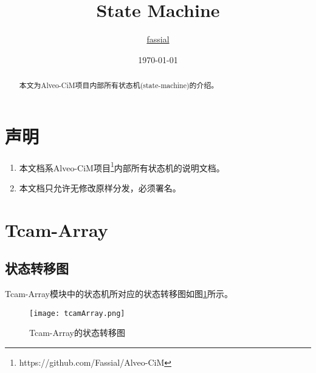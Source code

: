 \documentclass[lang=cn,11pt]{elegantpaper}
\title{State Machine}
\author{\href{https://github.com/Fassial/}{fassial}}
\date{\today}
\begin{document}
\maketitle

\begin{abstract}
本文为Alveo-CiM项目内部所有状态机(state-machine)的介绍。
\end{abstract}

\section{声明}
\begin{enumerate}
	\item 本文档系Alveo-CiM项目\footnote{https://github.com/Fassial/Alveo-CiM}内部所有状态机的说明文档。
	\item 本文档只允许无修改原样分发，必须署名。
\end{enumerate}

\section{Tcam-Array}
\subsection{状态转移图}
Tcam-Array模块中的状态机所对应的状态转移图如图\ref{tcamArray}所示。
\begin{figure}[htbp]
	\centering
	\texttt{[image: tcamArray.png]}
	\caption{Tcam-Array的状态转移图}
	\label{tcamArray}
\end{figure}
\end{document}
